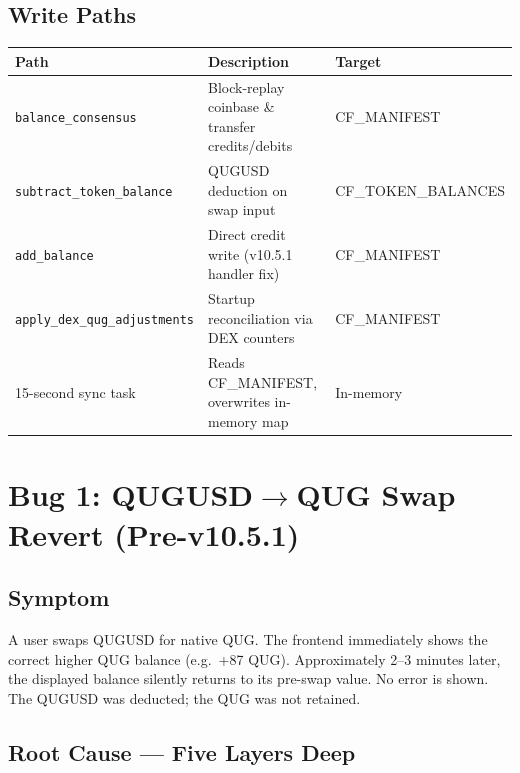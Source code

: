 \documentclass[11pt,a4paper]{article}
\begin{document}
\subsection{Write Paths}

\begin{center}
\begin{tabularx}{\textwidth}{lXl}
\toprule
\textbf{Path} & \textbf{Description} & \textbf{Target} \\
\midrule
\texttt{balance\_consensus} & Block-replay coinbase \& transfer credits/debits
  & CF\_MANIFEST \\
\texttt{subtract\_token\_balance} & QUGUSD deduction on swap input
  & CF\_TOKEN\_BALANCES \\
\texttt{add\_balance} & Direct credit write (v10.5.1 handler fix)
  & CF\_MANIFEST \\
\texttt{apply\_dex\_qug\_adjustments} & Startup reconciliation via DEX counters
  & CF\_MANIFEST \\
15-second sync task & Reads CF\_MANIFEST, overwrites in-memory map
  & In-memory \\
\bottomrule
\end{tabularx}
\end{center}

\section{Bug 1: QUGUSD$\to$QUG Swap Revert (Pre-v10.5.1)}

\subsection{Symptom}

A user swaps QUGUSD for native QUG.  The frontend immediately shows the
correct higher QUG balance (e.g.\ +87 QUG).  Approximately 2--3 minutes later,
the displayed balance silently returns to its pre-swap value.  No error is
shown.  The QUGUSD was deducted; the QUG was not retained.

\subsection{Root Cause — Five Layers Deep}
\end{document}
